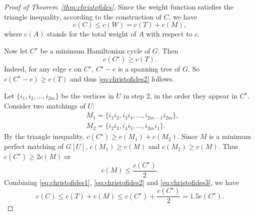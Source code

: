 \documentclass[12pt]{article}
\theoremstyle{remarkstyle}
\begin{document}
\begin{proof}[Proof of Theorem~\ref{thm:christofides}]\label{app:christofides}
	Since the weight function satisfies the triangle inequality, according to the construction of $C$, we have 
	\begin{equation}
		c(C) \leq c(W) = c(T) + c(M),
		\label{eq:christofides1}
	\end{equation}
	where $c(A)$ stands for the total weight of $A$ with respect to $c$.
	
	Now let $C^\star$ be a minimum Hamiltonian cycle of $G$. Then 
	\begin{equation}
		c(C^\star)\geq c(T).
		\label{eq:christofides2}
	\end{equation}
	Indeed, for any edge $e$ on $C^\star$, $C^\star-e$ is a spanning tree of $G$. So $c(C^\star-e)\geq c(T)$ and thus \eqref{eq:christofides2} follows.
	
	Let $\{i_1,i_2,\dots,i_{2m}\}$ be the vertices in $U$ in step $2$, in the order they appear in $C^\star.$ Consider two matchings of $U$:
	\begin{align*}
		&M_1=\{i_1i_2,i_3i_4,\dots,i_{2m-1}i_{2m}\},\\
		&M_2=\{i_2i_3,i_4i_5,\dots,i_{2m}i_1\}.
	\end{align*}
	By the triangle inequality, $c(C^\star)\geq c(M_1)+c(M_2).$ Since $M$ is a minimum perfect matching of $G[U]$, $c(M_1)\geq c(M)$ and $c(M_2)\geq c(M).$ Thus $c(C^\star)\geq 2c(M)$ or 
	\begin{equation}
		c(M)\leq \frac{c(C^\star)}{2}.
		\label{eq:christofides3}
	\end{equation}
	Combining \eqref{eq:christofides1}, \eqref{eq:christofides2} and \eqref{eq:christofides3}, we have 
	$$c(C)\leq c(T) + c(M) \leq c(C^\star) + \frac{c(C^\star)}{2} = 1.5c(C^\star).$$
\end{proof}
\end{document}
